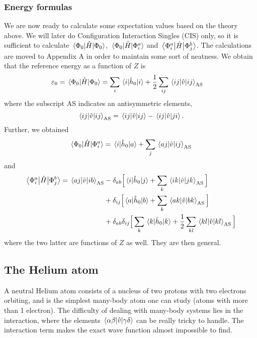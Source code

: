 \subsubsection{Energy formulas}
We are now ready to calculate some expectation values based on the theory above. We will later do Configuration Interaction Singles (CIS) only, so it is sufficient to calculate $\mel{\Phi_0}{\hat{H}}{\Phi_0}$, $\mel{\Phi_0}{\hat{H}}{\Phi_i^a}$ and $\mel{\Phi_i^a}{\hat{H}}{\Phi_j^b}$. The calculations are moved to Appendix A in order to maintain some sort of neatness. We obtain that the reference energy as a function
of $Z$ is
\begin{align}
	\varepsilon_0=\mel{\Phi_0}{\hat{H}}{\Phi_0}&=\sum_i\mel{i}{\hat{h}_0}{i}+\frac{1}{2}\sum_{ij}\mel{ij}{\hat{v}}{ij}_{\text{AS}}\label{eq:E_ref}
\end{align}
where the subscript AS indicates an antisymmetric elements,
\begin{equation}
\mel{ij}{\hat{v}}{ij}_{\text{AS}}=\mel{ij}{\hat{v}}{ij}-\mel{ij}{\hat{v}}{ji}.
\end{equation}
Further, we obtained
\begin{equation}
\mel{\Phi_0}{\hat{H}}{\Phi_i^a}=\mel{i}{\hat{h}_0}{a}+\sum_j\mel{aj}{\hat{v}}{ij}_{\text{AS}}
\end{equation}
and
\begin{align}
	\mel{\Phi_i^a}{\hat{H}}{\Phi_j^b}=\mel{aj}{\hat{v}}{ib}_{\text{AS}}&-\delta_{ab}\Big[\mel{i}{\hat{h}_0}{j}+\sum_k\mel{ik}{\hat{v}}{jk}_{\text{AS}}\Big]\notag\\
	&+\delta_{ij}\Big[\mel{a}{\hat{h}_0}{b}+\sum_k\mel{ak}{\hat{v}}{bk}_{\text{AS}}\Big]\\
	&+\delta_{ab}\delta_{ij}\Big[\sum_k\mel{k}{\hat{h}_0}{k}+\frac{1}{2}\sum_{kl}\mel{kl}{\hat{v}}{kl}_{\text{AS}}\Big]\notag
\end{align}
where the two latter are functions of $Z$ as well. They are then general.

\subsection{The Helium atom}
A neutral Helium atom consists of a nucleus of two protons with two electrons orbiting, and is the simplest many-body atom one can study (atoms with more than 1 electron). The difficulty of dealing with many-body systems lies in the interaction, where the elements $\mel{\alpha\beta}{\hat{v}}{\gamma\delta}$ can be really tricky to handle. The interaction term makes the exact wave function almost impossible to find.

